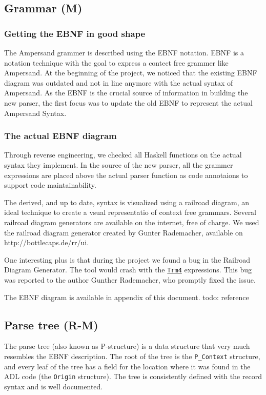 \subsection{Grammar (M)}
\label{subsec:analysis-grammar}
%
%
\subsubsection{Getting the EBNF in good shape}
The Ampersand grammer is described using the EBNF notation. 
EBNF is a notation technique with the goal to express a contect free grammer like Ampersand.
At the beginning of the project, we noticed that the existing EBNF diagram was outdated and not in line anymore with the actual syntax of Ampersand.
As the EBNF is the crucial source of information in building the new parser, the first focus was to update the old EBNF to represent the actual Ampersand Syntax.

\subsubsection{The actual EBNF diagram}
Through reverse engineering, we checked all Haskell functions on the actual syntax they implement.
In the source of the new parser, all the grammer expressions are placed above the actual parser function as code annotaions to support code maintainability.

The derived, and up to date, syntax is visualized using a railroad diagram, an ideal technique to create a vsual representatio of context free grammars.
Several railroad diagram generators are available on the internet, free of charge.
We used the railroad diagram generator created by Gunter Rademacher, available on http://bottlecaps.de/rr/ui.

One interesting plus is that during the project we found a bug in the Railroad Diagram Generator.
The tool would crash with the \hyperref[fig:ebnf-Trm4]{\texttt{Trm4}} expressions.
This bug was reported to the author Gunther Rademacher, who promptly fixed the issue.

The EBNF diagram is available in appendix of this document. todo: reference

\subsection{Parse tree (R-M)}
\label{subsec:analysis-parse-tree}
The parse tree (also known as P-structure) is a data structure that very much resembles the EBNF description.
The root of the tree is the \texttt{P\_Context} structure, and every leaf of the tree has a field for the location where it was found in the ADL code (the \texttt{Origin} structure).
The tree is consistently defined with the record syntax and is well documented.

